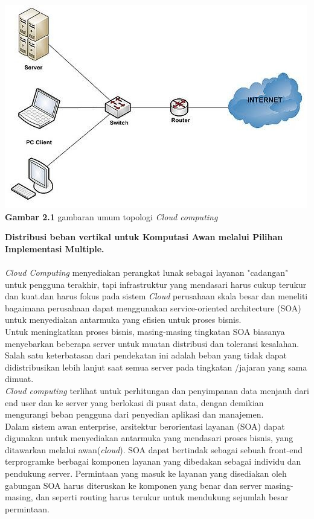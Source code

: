 \begin{center}
\includegraphics[scale=1]{gambar21.jpg} \\
\textbf{Gambar  2.1} gambaran umum topologi \textit{Cloud computing}
\end{center}
\textbf{Distribusi beban vertikal untuk Komputasi Awan melalui Pilihan Implementasi  Multiple.}
\\\\
\textit{Cloud Computing} menyediakan perangkat lunak sebagai layanan "cadangan" untuk pengguna terakhir, tapi infrastruktur yang mendasari harus cukup terukur dan kuat.dan harus fokus pada sistem \textit{Cloud} perusahaan skala besar dan meneliti  bagaimana  perusahaan dapat menggunakan service-oriented architecture (SOA) untuk menyediakan antarmuka yang efisien untuk proses bisnis.\\
\tab Untuk meningkatkan proses bisnis, masing-masing tingkatan SOA biasanya menyebarkan beberapa server untuk muatan distribusi dan toleransi kesalahan. Salah satu keterbatasan dari pendekatan ini adalah beban yang tidak dapat didistribusikan lebih lanjut saat semua server pada tingkatan /jajaran yang sama dimuat.\\
\textit{Cloud computing} terlihat untuk perhitungan dan penyimpanan data menjauh dari end user dan ke server yang berlokasi di pusat data, dengan demikian mengurangi beban pengguna dari penyedian aplikasi dan manajemen. \\
\tab Dalam sistem awan enterprise, arsitektur berorientasi layanan  (SOA)  dapat digunakan untuk menyediakan antarmuka yang mendasari proses bisnis, yang ditawarkan melalui awan(\textit{cloud}). SOA dapat bertindak sebagai sebuah front-end terprogramke berbagai komponen layanan yang dibedakan           sebagai individu dan pendukung server. Permintaan yang masuk ke layanan yang disediakan oleh gabungan SOA harus diteruskan ke komponen yang benar dan server masing-masing, dan seperti routing harus  terukur untuk mendukung sejumlah besar  permintaan.\\
